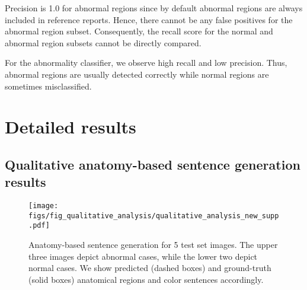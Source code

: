 \documentclass[10pt,twocolumn,letterpaper]{article}
\begin{document}
Precision is 1.0 for abnormal regions since by default abnormal regions are always included in reference reports. Hence, there cannot be any false positives for the abnormal region subset. Consequently, the recall score for the normal and abnormal region subsets cannot be directly compared.

For the abnormality classifier, we observe high recall and low precision. Thus, abnormal regions are usually detected correctly while normal regions are sometimes misclassified.

\FloatBarrier
\clearpage

\section{Detailed results}\label{appendix:additional_results}
\subsection{Qualitative anatomy-based sentence generation results}
\begin{figure}[ht!]
  \centering
   \texttt{[image: figs/fig\_qualitative\_analysis/qualitative\_analysis\_new\_supp.pdf]}
   \caption{Anatomy-based sentence generation for 5 test set images. The upper three images depict abnormal cases, while the lower two depict normal cases. We show predicted (dashed boxes) and ground-truth (solid boxes) anatomical regions and color sentences accordingly.}
   \label{fig:qualitative_analysis_anatomy_based_generation}
\end{figure}
\end{document}
